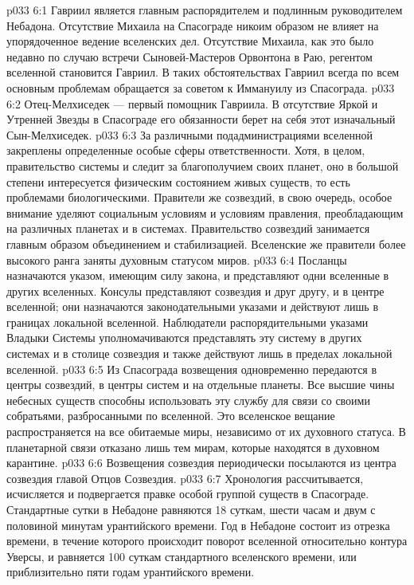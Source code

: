 \vs p033 6:1 Гавриил является главным распорядителем и подлинным руководителем Небадона. Отсутствие Михаила на Спасограде никоим образом не влияет на упорядоченное ведение вселенских дел. Отсутствие Михаила, как это было недавно по случаю встречи Сыновей\hyp{}Мастеров Орвонтона в Раю, регентом вселенной становится Гавриил. В таких обстоятельствах Гавриил всегда по всем основным проблемам обращается за советом к Иммануилу из Спасограда.
\vs p033 6:2 Отец\hyp{}Мелхиседек --- первый помощник Гавриила. В отсутствие Яркой и Утренней Звезды в Спасограде его обязанности берет на себя этот изначальный Сын\hyp{}Мелхиседек.
\vs p033 6:3 \pc За различными подадминистрациями вселенной закреплены определенные особые сферы ответственности. Хотя, в целом, правительство системы и следит за благополучием своих планет, оно в большой степени интересуется физическим состоянием живых существ, то есть проблемами биологическими. Правители же созвездий, в свою очередь, особое внимание уделяют социальным условиям и условиям правления, преобладающим на различных планетах и в системах. Правительство созвездий занимается главным образом объединением и стабилизацией. Вселенские же правители более высокого ранга заняты духовным статусом миров.
\vs p033 6:4 \pc Посланцы назначаются указом, имеющим силу закона, и представляют одни вселенные в других вселенных. Консулы представляют созвездия и друг другу, и в центре вселенной; они назначаются законодательными указами и действуют лишь в границах локальной вселенной. Наблюдатели распорядительными указами Владыки Системы уполномачиваются представлять эту систему в других системах и в столице созвездия и также действуют лишь в пределах локальной вселенной.
\vs p033 6:5 \pc Из Спасограда возвещения одновременно передаются в центры созвездий, в центры систем и на отдельные планеты. Все высшие чины небесных существ способны использовать эту службу для связи со своими собратьями, разбросанными по вселенной. Это вселенское вещание распространяется на все обитаемые миры, независимо от их духовного статуса. В планетарной связи отказано лишь тем мирам, которые находятся в духовном карантине.
\vs p033 6:6 Возвещения созвездия периодически посылаются из центра созвездия главой Отцов Созвездия.
\vs p033 6:7 \pc Хронология рассчитывается, исчисляется и подвергается правке особой группой существ в Спасограде. Стандартные сутки в Небадоне равняются 18 суткам, шести часам и двум с половиной минутам урантийского времени. Год в Небадоне состоит из отрезка времени, в течение которого происходит поворот вселенной относительно контура Уверсы, и равняется 100 суткам стандартного вселенского времени, или приблизительно пяти годам урантийского времени.
